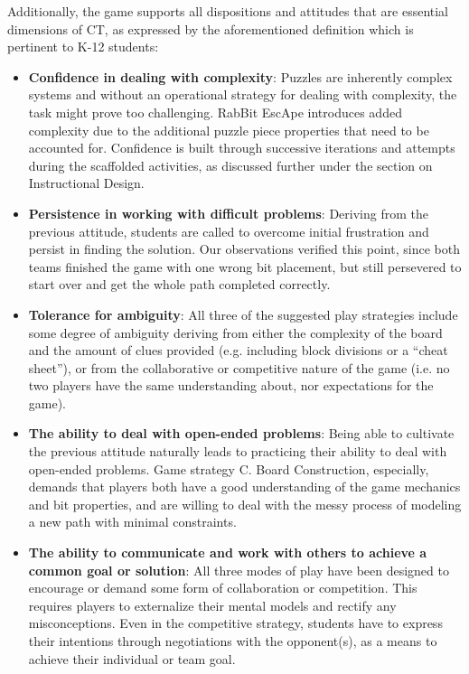 \documentclass{acm_proc_article-sp}
\begin{document}
Additionally, the game supports all dispositions and attitudes that are essential dimensions of CT, as expressed by the aforementioned definition which is pertinent to K-12 students:
\begin{itemize}
       \item \textbf{Confidence in dealing with complexity\label{itm:1_confidence}}:
       Puzzles are inherently complex systems and without an operational strategy for dealing with complexity, the task might prove too challenging.
       RabBit EscApe introduces added complexity due to the additional puzzle piece properties that need to be accounted for.
       Confidence is built through successive iterations and attempts during the scaffolded activities, as discussed further under the section on Instructional Design.
       \item \textbf{Persistence in working with difficult problems\label{itm:2_persistence}}:
       Deriving from the previous attitude, students are called to overcome initial frustration and persist in finding the solution. Our observations verified this point, since both teams finished the game with one wrong bit placement, but still persevered to start over and get the whole path completed correctly.
       \item \textbf{Tolerance for ambiguity\label{itm:3_tolerance}}: 
       All three of the suggested play strategies include some degree of ambiguity deriving from either the complexity of the board and the amount of clues provided (e.g. including block divisions or a ``cheat sheet''), or from the collaborative or competitive nature of the game (i.e. no two  players have the same understanding about, nor expectations for the game). 
       \item \textbf{The ability to deal with open-ended problems\label{itm:4_open_ended}}:
       Being able to cultivate the previous attitude naturally leads to practicing their ability to deal with open-ended problems. Game strategy C. Board Construction, especially, demands that players both have a good understanding of the game mechanics and bit properties, and are willing to deal with the messy process of modeling a new path with minimal constraints.
       \item \textbf{The ability to communicate and work with others to achieve a common goal or solution\label{itm:5_communicate}}:
       All three modes of play have been designed to encourage or demand some form of collaboration or competition.
       This requires players to externalize their mental models and rectify any misconceptions.
       Even in the competitive strategy, students have to express their intentions through negotiations with the opponent(s), as a means to achieve their individual or team goal.
\end{itemize}
\end{document}
